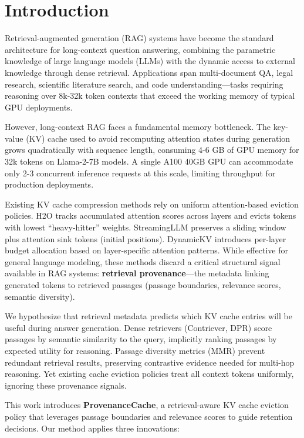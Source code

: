 \section{Introduction}

Retrieval-augmented generation (RAG) systems have become the standard architecture for long-context question answering, combining the parametric knowledge of large language models (LLMs) with the dynamic access to external knowledge through dense retrieval. Applications span multi-document QA, legal research, scientific literature search, and code understanding---tasks requiring reasoning over 8k-32k token contexts that exceed the working memory of typical GPU deployments.

However, long-context RAG faces a fundamental memory bottleneck. The key-value (KV) cache used to avoid recomputing attention states during generation grows quadratically with sequence length, consuming 4-6 GB of GPU memory for 32k tokens on Llama-2-7B models. A single A100 40GB GPU can accommodate only 2-3 concurrent inference requests at this scale, limiting throughput for production deployments.

Existing KV cache compression methods rely on uniform attention-based eviction policies. H2O \cite{zhang2023h2o} tracks accumulated attention scores across layers and evicts tokens with lowest ``heavy-hitter'' weights. StreamingLLM \cite{xiao2024streamingllm} preserves a sliding window plus attention sink tokens (initial positions). DynamicKV \cite{liu2024dynamickv} introduces per-layer budget allocation based on layer-specific attention patterns. While effective for general language modeling, these methods discard a critical structural signal available in RAG systems: \textbf{retrieval provenance}---the metadata linking generated tokens to retrieved passages (passage boundaries, relevance scores, semantic diversity).

We hypothesize that retrieval metadata predicts which KV cache entries will be useful during answer generation. Dense retrievers (Contriever, DPR) score passages by semantic similarity to the query, implicitly ranking passages by expected utility for reasoning. Passage diversity metrics (MMR) prevent redundant retrieval results, preserving contrastive evidence needed for multi-hop reasoning. Yet existing cache eviction policies treat all context tokens uniformly, ignoring these provenance signals.

This work introduces \textbf{ProvenanceCache}, a retrieval-aware KV cache eviction policy that leverages passage boundaries and relevance scores to guide retention decisions. Our method applies three innovations:

